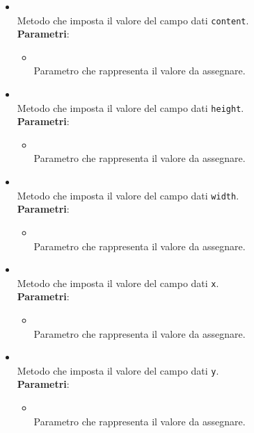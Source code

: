 \begin{itemize}
\begin{itemize}
\begin{itemize}
\end{itemize}
\item {}
\\ Metodo che imposta il valore del campo dati \texttt{content}.
\\ \textbf{Parametri}:
\begin{itemize}
\item {}
\\ Parametro che rappresenta il valore da assegnare.
\end{itemize}
\item {}
\\ Metodo che imposta il valore del campo dati \texttt{height}.
\\ \textbf{Parametri}:
\begin{itemize}
\item {}
\\ Parametro che rappresenta il valore da assegnare.
\end{itemize}
\item {}
\\ Metodo che imposta il valore del campo dati \texttt{width}.
\\ \textbf{Parametri}:
\begin{itemize}
\item {}
\\ Parametro che rappresenta il valore da assegnare.
\end{itemize}
\item {}
\\ Metodo che imposta il valore del campo dati \texttt{x}.
\\ \textbf{Parametri}:
\begin{itemize}
\item {}
\\ Parametro che rappresenta il valore da assegnare.
\end{itemize}
\item {}
\\ Metodo che imposta il valore del campo dati \texttt{y}.
\\ \textbf{Parametri}:
\begin{itemize}
\item {}
\\ Parametro che rappresenta il valore da assegnare.
\end{itemize}
\end{itemize}
\end{itemize}
